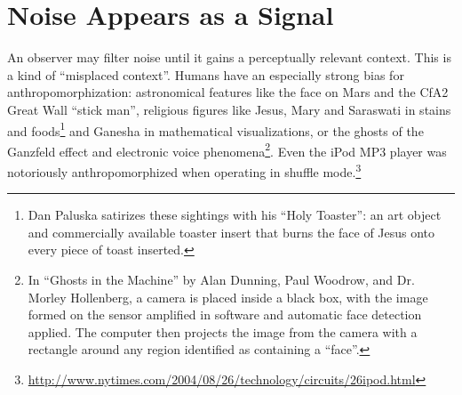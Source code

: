 \documentclass{thesis}
\begin{document}
\section{Noise Appears as a Signal}

An observer may filter noise until it gains a perceptually relevant context. This is a kind of ``misplaced context''. Humans have an especially strong bias for anthropomorphization: astronomical features like the face on Mars\cite{brian_dunning_facemars_2008} and the CfA2 Great Wall ``stick man''\cite{de_lapparent_slice_1986}, religious figures like Jesus, Mary and Saraswati in stains and foods\cite{boston.com_religious_????}\footnote{Dan Paluska satirizes these sightings with his ``Holy Toaster''\cite{dan_paluska_holy_2005}: an art object and commercially available toaster insert that burns the face of Jesus onto every piece of toast inserted.} and Ganesha in mathematical visualizations\cite{melinda_green_buddhabrot_1993}, or the ghosts of the Ganzfeld effect and electronic voice phenomena\footnote{In ``Ghosts in the Machine'' by Alan Dunning, Paul Woodrow, and Dr. Morley Hollenberg\cite{alan_dunning_paul_woodrow_and_morley_hollenberg_einsteins_2008}, a camera is placed inside a black box, with the image formed on the sensor amplified in software and automatic face detection applied. The computer then projects the image from the camera with a rectangle around any region identified as containing a ``face''.}. Even the iPod MP3 player was notoriously anthropomorphized when operating in shuffle mode.\footnote{\url{http://www.nytimes.com/2004/08/26/technology/circuits/26ipod.html}}
\end{document}
